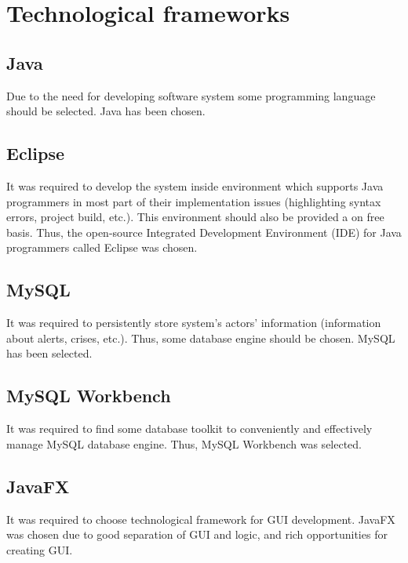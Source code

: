 \chapter{Technological frameworks}
\label{chap:techFrm}


% 

\section{Java}
\label{sec:java}
Due to the need for developing software system some programming language should
be selected. Java has been chosen.


\section{Eclipse}
\label{sec:eclipse}
It was required to develop the system inside environment which supports
Java programmers in most part of their implementation issues (highlighting syntax
errors, project build, etc.). This environment should also be provided a on free
basis. Thus, the open-source Integrated Development Environment (IDE) for Java
programmers called Eclipse was chosen.

\section{MySQL}
\label{sec:mysql}
It was required to persistently store system's actors' information (information
about alerts, crises, etc.). Thus, some database engine should be chosen. MySQL
has been selected.

\section{MySQL Workbench}
\label{sec:mysqlworkbench}
It was required to find some database toolkit to conveniently and effectively
manage MySQL database engine. Thus, MySQL Workbench was selected.

\section{JavaFX}
\label{sec:javafx}
It was required to choose technological framework for GUI development. JavaFX
was chosen due to good separation of GUI and logic, and rich opportunities for
creating GUI.

